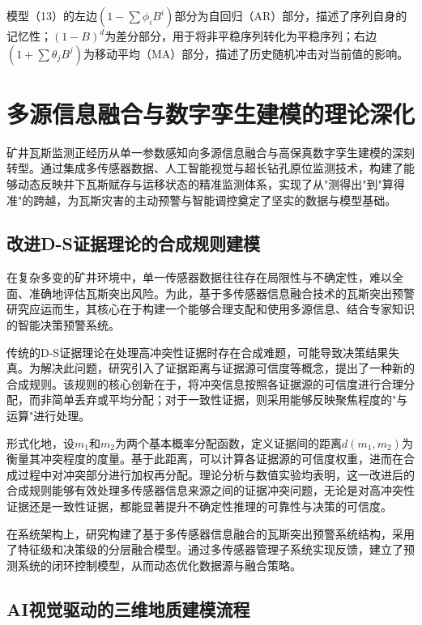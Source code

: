 \documentclass[twocolumn,a4paper]{ctexart}
\numberwithin{equation}{section}
\begin{document}
模型（13）的左边$\left(1-\sum\phi_i B^i\right)$部分为自回归（AR）部分，描述了序列自身的记忆性；$(1-B)^d$为差分部分，用于将非平稳序列转化为平稳序列；右边$\left(1+\sum\theta_j B^j\right)$为移动平均（MA）部分，描述了历史随机冲击对当前值的影响。

\section{多源信息融合与数字孪生建模的理论深化}

矿井瓦斯监测正经历从单一参数感知向多源信息融合与高保真数字孪生建模的深刻转型。通过集成多传感器数据、人工智能视觉与超长钻孔原位监测技术，构建了能够动态反映井下瓦斯赋存与运移状态的精准监测体系，实现了从"测得出"到"算得准"的跨越，为瓦斯灾害的主动预警与智能调控奠定了坚实的数据与模型基础。

\subsection{改进D-S证据理论的合成规则建模}

在复杂多变的矿井环境中，单一传感器数据往往存在局限性与不确定性，难以全面、准确地评估瓦斯突出风险。为此，基于多传感器信息融合技术的瓦斯突出预警研究应运而生，其核心在于构建一个能够合理支配和使用多源信息、结合专家知识的智能决策预警系统。

传统的D-S证据理论在处理高冲突性证据时存在合成难题，可能导致决策结果失真。为解决此问题，研究引入了证据距离与证据源可信度等概念，提出了一种新的合成规则。该规则的核心创新在于，将冲突信息按照各证据源的可信度进行合理分配，而非简单丢弃或平均分配；对于一致性证据，则采用能够反映聚焦程度的"与运算"进行处理。

形式化地，设$m_1$和$m_2$为两个基本概率分配函数，定义证据间的距离$d(m_1,m_2)$为衡量其冲突程度的度量。基于此距离，可以计算各证据源的可信度权重，进而在合成过程中对冲突部分进行加权再分配。理论分析与数值实验均表明，这一改进后的合成规则能够有效处理多传感器信息来源之间的证据冲突问题，无论是对高冲突性证据还是一致性证据，都能显著提升不确定性推理的可靠性与决策的可信度。

在系统架构上，研究构建了基于多传感器信息融合的瓦斯突出预警系统结构，采用了特征级和决策级的分层融合模型。通过多传感器管理子系统实现反馈，建立了预测系统的闭环控制模型，从而动态优化数据源与融合策略。

\subsection{AI视觉驱动的三维地质建模流程}
\end{document}
